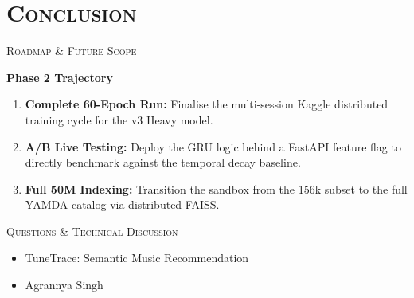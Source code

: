 \documentclass[xcolor=dvipsnames, aspectratio=1610]{beamer}
\begin{document}
\section{\textsc{Conclusion}}
\begin{frame}{\textsc{Roadmap \& Future Scope}}

  \begin{ProposalBox}
    \textbf{Phase 2 Trajectory}
    \begin{enumerate}
      \item \textbf{Complete 60-Epoch Run:} Finalise the multi-session Kaggle distributed training cycle for the v3 Heavy model.
      \item \textbf{A/B Live Testing:} Deploy the GRU logic behind a FastAPI feature flag to directly benchmark against the temporal decay baseline.
      \item \textbf{Full 50M Indexing:} Transition the sandbox from the 156k subset to the full YAMDA catalog via distributed FAISS.
    \end{enumerate}
  \end{ProposalBox}

\end{frame}

\begin{frame}[plain]
  \vspace{10mm}
  \centering
  \Huge \textsc{Questions \& Technical Discussion}
  \vspace{5mm}
  \normalsize
  \begin{itemize}
      \item TuneTrace: Semantic Music Recommendation
      \item Agrannya Singh
  \end{itemize}
\end{frame}
\end{document}
